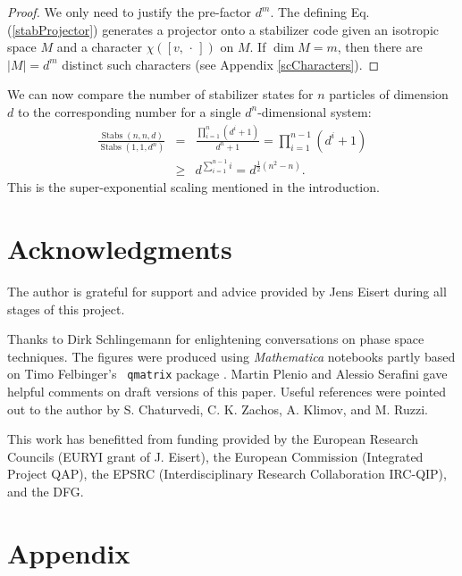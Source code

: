 \documentclass[aps,twocolumn,floatfix]{revtex4}
\def\spacedot{\,\cdot\,}
\DeclareMathOperator{\Stabs}{Stabs}
\begin{document}
\begin{proof}
	We only need to justify the pre-factor $d^m$.  The defining Eq.
	(\ref{stabProjector}) generates a projector onto a stabilizer code
	given an isotropic space $M$ and a character $\chi([v,\spacedot])$
	on $M$. If $\dim M = m$, then there are $|M|=d^m$ distinct such
	characters (see Appendix \ref{scCharacters}).
\end{proof}

We can now compare the number of stabilizer states for $n$ particles
of dimension $d$ to the corresponding number for a single
$d^n$-dimensional system:
\begin{eqnarray*}
	\frac{\Stabs(n,n,d)}{\Stabs(1,1,d^n)}
	&=& \frac{\prod_{i=1}^n (d^i+1)}{d^n+1} 
	= \prod_{i=1}^{n-1} (d^i+1) \\
	&\geq& d^{\sum_{i=1}^{n-1} i} 
	= d^{\frac12(n^2-n)}. 
\end{eqnarray*}
This is the super-exponential scaling mentioned in the introduction.


\section{Acknowledgments}

The author is grateful for support and advice provided by Jens Eisert
during all stages of this project.

Thanks to Dirk Schlingemann for enlightening conversations on phase
space techniques.  The figures were produced using \emph{Mathematica}
notebooks \cite{diploma} partly based on Timo Felbinger's {\tt
qmatrix} package \cite{timo}. Martin Plenio and Alessio Serafini gave
helpful comments on draft versions of this paper. Useful references
were pointed out to the author by S. Chaturvedi, C. K. Zachos,  A. Klimov, 
and M. Ruzzi.

This work has benefitted from funding provided by the European
Research Councils (EURYI grant of J. Eisert), the European Commission
(Integrated Project QAP), the EPSRC (Interdisciplinary Research
Collaboration IRC-QIP), and the DFG.

\section{Appendix}
\end{document}
